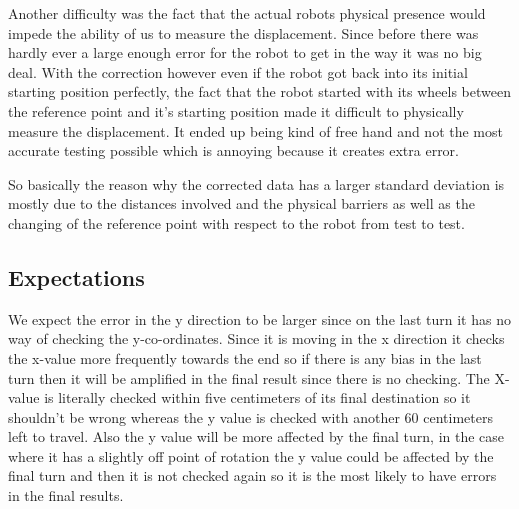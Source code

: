 \documentclass[letterpaper,12pt]{article}
\begin{document}
{{Another difficulty was the fact that the actual robots physical presence would impede the ability of us to measure the displacement. Since before there was hardly ever a large enough error for the robot to get in the way it was no big deal. With the correction however even if the robot got back into its initial starting position perfectly, the fact that the robot started with its wheels between the reference point and it's starting position made it difficult to physically measure the displacement. It ended up being kind of free hand and not the most accurate testing possible which is annoying because it creates extra error. 

So basically the reason why the corrected data has a larger standard deviation is mostly due to the distances involved and the physical barriers as well as the changing of the reference point with respect to the robot from test to test.}

\subsection{Expectations}{We expect the error in the y direction to be larger since on the last turn it has no way of checking the y-co-ordinates. Since it is moving in the x direction it checks the x-value more frequently towards the end so if there is any bias in the last turn then it will be amplified in the final result since there is no checking. The X-value is literally checked within five centimeters of its final destination so it shouldn't be wrong whereas the y value is checked with another 60 centimeters left to travel. Also the y value will be more affected by the final turn, in the case where it has a slightly off point of rotation the y value could be affected by the final turn and then it is not checked again so it is the most likely to have errors in the final results. 
}
}
\end{document}
